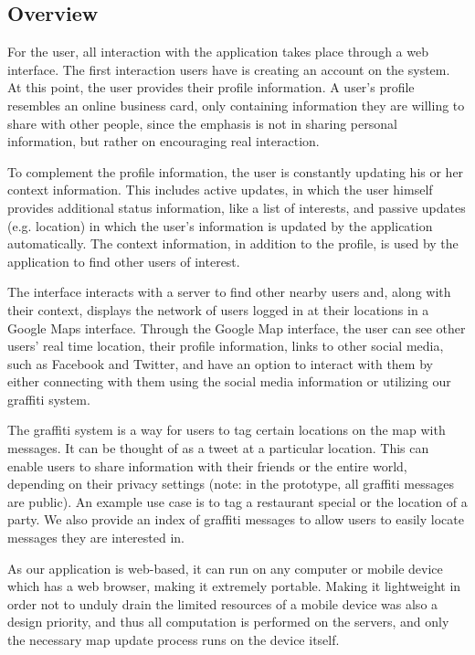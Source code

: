 \documentclass[11pt]{article}
\begin{document}
\subsection{Overview}

For the user, all interaction with the application takes place through
a web interface. The first interaction users have is creating an
account on the system.  At this point, the user provides their profile
information. A user's profile resembles an online business card, only
containing information they are willing to share with other people,
since the emphasis is not in sharing personal information, but rather
on encouraging real interaction.

To complement the profile information, the user is constantly updating his
or her context information. This includes active updates, in which the user
himself provides additional status information, like a list of interests,
and passive updates (e.g. location) in which the user's information is updated
by the application automatically. The context information, in addition to
the profile, is used by the application to find other users of interest.

The interface interacts with a server to find other nearby users and,
along with their context, displays the network of users logged in at
their locations in a Google Maps interface. Through the Google Map
interface, the user can see other users' real time location, their profile
information, links to other social media, such as Facebook and Twitter,
and have an option to interact with them by either connecting with them
using the social media information or utilizing our graffiti system.

The graffiti system is a way for users to tag certain locations on the 
map with messages. It can be thought of as a tweet at a particular location.
This can enable users to share information with their friends or the entire world,
depending on their privacy settings (note: in the prototype, all graffiti messages
are public). An example use case is to tag a restaurant special or the location
of a party. We also provide an index of graffiti messages to allow users to
easily locate messages they are interested in.

As our application is web-based, it can run on any computer or mobile
device which has a web browser, making it extremely portable. Making
it lightweight in order not to unduly drain the limited resources of
a mobile device was also a design priority, and thus all computation is
performed on the servers, and only the necessary map update process runs
on the device itself.
\end{document}
